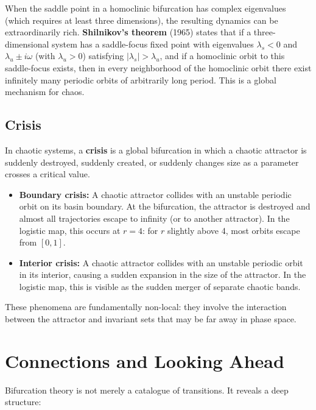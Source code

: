 When the saddle point in a homoclinic bifurcation has complex eigenvalues (which requires at least three dimensions), the resulting dynamics can be extraordinarily rich. \textbf{Shilnikov's theorem} (1965) states that if a three-dimensional system has a saddle-focus fixed point with eigenvalues $\lambda_s < 0$ and $\lambda_u \pm i\omega$ (with $\lambda_u > 0$) satisfying $|\lambda_s| > \lambda_u$, and if a homoclinic orbit to this saddle-focus exists, then in every neighborhood of the homoclinic orbit there exist infinitely many periodic orbits of arbitrarily long period. This is a global mechanism for chaos.

\subsection{Crisis}\label{sec:5.7.3}

In chaotic systems, a \textbf{crisis} is a global bifurcation in which a chaotic attractor is suddenly destroyed, suddenly created, or suddenly changes size as a parameter crosses a critical value.

\begin{itemize}[nosep]
  \item \textbf{Boundary crisis:} A chaotic attractor collides with an unstable periodic orbit on its basin boundary. At the bifurcation, the attractor is destroyed and almost all trajectories escape to infinity (or to another attractor). In the logistic map, this occurs at $r = 4$: for $r$ slightly above 4, most orbits escape from $[0,1]$.

  \item \textbf{Interior crisis:} A chaotic attractor collides with an unstable periodic orbit in its interior, causing a sudden expansion in the size of the attractor. In the logistic map, this is visible as the sudden merger of separate chaotic bands.
\end{itemize}

These phenomena are fundamentally non-local: they involve the interaction between the attractor and invariant sets that may be far away in phase space.


\bigskip


\section{Connections and Looking Ahead}\label{sec:5.8}

Bifurcation theory is not merely a catalogue of transitions. It reveals a deep structure:

